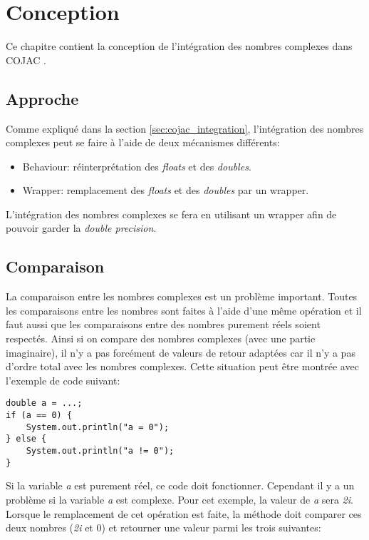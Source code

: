 \chapter{Conception}

Ce chapitre contient la conception de l'intégration des nombres complexes dans COJAC \cite{COJAC}.

\section{Approche}
\label{sec:complex_approach}

Comme expliqué dans la section \ref{sec:cojac_integration}, l'intégration des nombres complexes peut se faire à l'aide de deux mécanismes différents:
\begin{itemize}
    \item Behaviour: réinterprétation des \textit{floats} et des \textit{doubles}.
    \item Wrapper: remplacement des \textit{floats} et des \textit{doubles} par un wrapper.
\end{itemize}

L'intégration des nombres complexes se fera en utilisant un wrapper afin de pouvoir garder la \textit{double precision}.

\section{Comparaison}

La comparaison entre les nombres complexes est un problème important. Toutes les comparaisons entre les nombres sont faites à l'aide d'une même opération et il faut aussi que les comparaisons entre des nombres purement réels soient respectés. Ainsi si on compare des nombres complexes (avec une partie imaginaire), il n'y a pas forcément de valeurs de retour adaptées car il n'y a pas d'ordre total avec les nombres complexes. Cette situation peut être montrée avec l'exemple de code suivant:

\begin{verbatim}
double a = ...;
if (a == 0) {
    System.out.println("a = 0");
} else {
    System.out.println("a != 0");
}
\end{verbatim}

Si la variable \textit{a} est purement réel, ce code doit fonctionner. Cependant il y a un problème si la variable \textit{a} est complexe. Pour cet exemple, la valeur de \textit{a} sera \textit{2i}. Lorsque le remplacement de cet opération est faite, la méthode doit comparer ces deux nombres (\textit{2i} et 0) et retourner une valeur parmi les trois suivantes:

